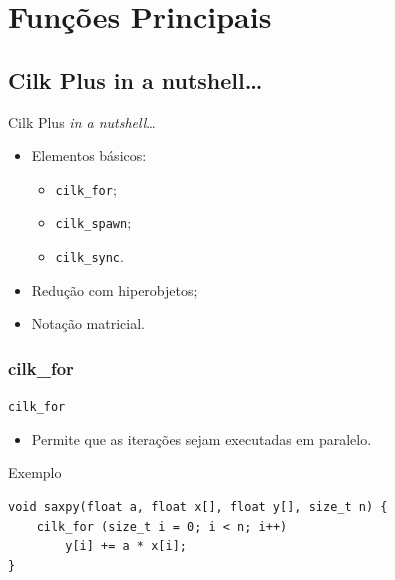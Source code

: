 \documentclass{beamer}
\begin{document}
\section{Funções Principais}
\subsection{Cilk Plus in a nutshell\ldots}
\begin{frame}{Cilk Plus \textit{in a nutshell}\ldots}
\begin{itemize}
    \item Elementos básicos:
    \begin{itemize}
        \item \texttt{cilk\_for};
        \item \texttt{cilk\_spawn};
        \item \texttt{cilk\_sync}.
    \end{itemize}
    \item Redução com hiperobjetos;
    \item Notação matricial.
\end{itemize}
\end{frame}
\subsubsection{cilk\_for}
\begin{frame}[fragile]{\texttt{cilk\_for}}
\begin{itemize}
    \item Permite que as iterações sejam executadas em paralelo.
\end{itemize}
\begin{block}{Exemplo}
\begin{lstlisting}
void saxpy(float a, float x[], float y[], size_t n) {
    cilk_for (size_t i = 0; i < n; i++)
        y[i] += a * x[i];
}
\end{lstlisting}
\end{block}
\end{frame}
\end{document}
